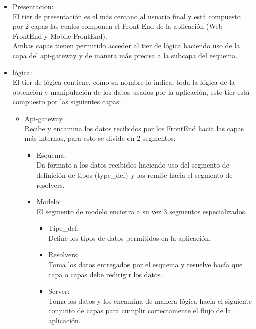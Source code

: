 \begin{itemize}
    \item Presentacion: \\
    El tier de presentación es el más cercano al usuario final y está compuesto por 2 capas las cuales componen el Front End de la aplicación (Web FrontEnd y Mobile FrontEnd). \\
    Ambas capas tienen permitido acceder al tier de lógica haciendo uso de la capa del api-gateway y de manera más precisa a la subcapa del esquema.
    
    \item lógica: \\
    El tier  de lógica contiene, como su nombre lo indica, toda la lógica de la obtención y manipulación de los datos usados por la aplicación, este tier está compuesto por las siguientes capas: \\
    \begin{itemize}
        \item Api-gateway \\
        Recibe y encamina los datos recibidos por los FrontEnd hacia las capas más internas, para esto se divide en 2 segmentos: 
        
        \begin{itemize}
            \item Esquema: \\
            Da formato a los datos recibidos haciendo uso del segmento de definición de tipos (type\_def) y los remite hacia el segmento de resolvers. 
            \item Modelo: \\
            El segmento de modelo encierra a su vez 3 segmentos especializados.
            \begin{itemize}
                \item Tipe\_def:\\
                Define los tipos de datos permitidos en la aplicación.
                \item Resolvers:\\
                Toma los datos entregados por el esquema y resuelve hacía que capa o capas debe redirigir los datos.
                \item Server:\\
                Toma los datos y los encamina de manera lógica hacia el siguiente conjunto de capas para cumplir correctamente el flujo de la aplicación.
            \end{itemize}
        \end{itemize}
        

\end{itemize}
\end{itemize}
